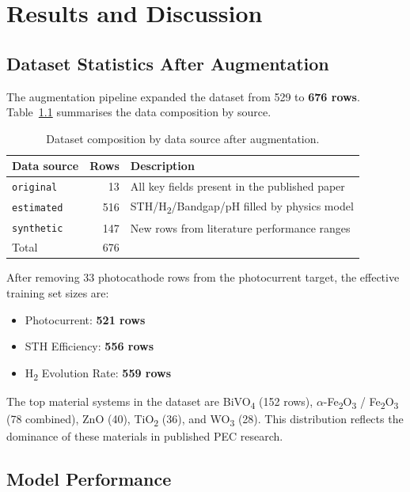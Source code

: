 \chapter{Results and Discussion}\label{ch:C}

\section{Dataset Statistics After Augmentation}

The augmentation pipeline expanded the dataset from 529 to \textbf{676 rows}.
Table~\ref{tab:augmented_summary} summarises the data composition by source.

\begin{table}[h]
\centering
\caption{Dataset composition by data source after augmentation.}
\label{tab:augmented_summary}
\begin{tabular}{lrl}
\toprule
Data source & Rows & Description \\
\midrule
\texttt{original}  & 13  & All key fields present in the published paper \\
\texttt{estimated} & 516 & STH/H\textsubscript{2}/Bandgap/pH filled by physics model \\
\texttt{synthetic} & 147 & New rows from literature performance ranges \\
\midrule
Total              & 676 & \\
\bottomrule
\end{tabular}
\end{table}

After removing 33 photocathode rows from the photocurrent target,
the effective training set sizes are:
\begin{itemize}
  \item Photocurrent: \textbf{521 rows}
  \item STH Efficiency: \textbf{556 rows}
  \item H\textsubscript{2} Evolution Rate: \textbf{559 rows}
\end{itemize}

The top material systems in the dataset are BiVO\textsubscript{4} (152 rows),
$\alpha$-Fe\textsubscript{2}O\textsubscript{3} / Fe\textsubscript{2}O\textsubscript{3}
(78 combined), ZnO (40), TiO\textsubscript{2} (36), and WO\textsubscript{3} (28).
This distribution reflects the dominance of these materials in published PEC research.

\section{Model Performance}

